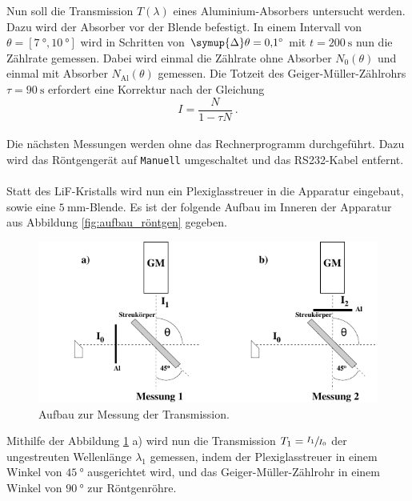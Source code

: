     Nun soll die Transmission $T(\lambda)$ eines Aluminium-Absorbers untersucht werden.
    Dazu wird der Absorber vor der Blende befestigt.
    In einem Intervall von $\theta = [\SI{7}{\degree}, \SI{10}{\degree}]$ wird in Schritten von $\symup{\Delta}\theta = \SI{0.1}{\degree}$ mit $t = \SI{200}{\second}$ nun die Zählrate gemessen.
    Dabei wird einmal die Zählrate ohne Absorber $N_0(\theta)$ und einmal mit Absorber $N_\text{Al}(\theta)$ gemessen.
    Die Totzeit des Geiger-Müller-Zählrohrs $\tau = \SI{90}{\second}$ erfordert eine Korrektur nach der Gleichung
    \begin{equation*}
        I = \frac{N}{1 - \tau N} \ .
    \end{equation*}
    \\
    Die nächsten Messungen werden ohne das Rechnerprogramm durchgeführt.
    Dazu wird das Röntgengerät auf \texttt{Manuell} umgeschaltet und das RS232-Kabel entfernt.\\
    \\
    Statt des LiF-Kristalls wird nun ein Plexiglasstreuer in die Apparatur eingebaut,
    sowie eine $\SI{5}{\milli\meter}$-Blende.
    Es ist der folgende Aufbau im Inneren der Apparatur aus Abbildung \ref{fig:aufbau_röntgen} gegeben.
    \begin{figure}[H]
        \centering
        \includegraphics[scale=1]{content/img/Abb_3.pdf}
        \caption{Aufbau zur Messung der Transmission.}
        \label{fig:aufbau_transmission}
    \end{figure}
    Mithilfe der Abbildung \ref{fig:aufbau_transmission} a) wird nun die Transmission $T_1 = \sfrac{I_1}{I_0}$ der ungestreuten Wellenlänge $\lambda_1$ gemessen,
    indem der Plexiglasstreuer in einem Winkel von $\SI{45}{\degree}$ ausgerichtet wird,
    und das Geiger-Müller-Zählrohr in einem Winkel von $\SI{90}{\degree}$ zur Röntgenröhre.
